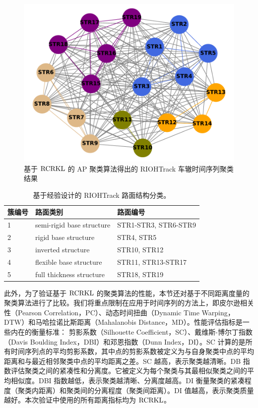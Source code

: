\begin{figure}[htbp]
\begin{center}
\includegraphics[scale=0.5]{./ch2/fig2_9.pdf}
\caption{基于 $\rm{RCRKL}$ 的 AP 聚类算法得出的 RIOHTrack 车辙时间序列聚类结果} \label{fig3}
\end{center}
\end{figure}

\begin{table}[!ht]
\fontsize{8}{14}\selectfont
\centering
\caption{基于经验设计的 RIOHTrack 路面结构分类。}
\begin{tabular}{lll}
 \hline
 簇编号 &  路面类别 & 路面编号\\
  \hline
  1 &  semi-rigid base structure & STR1-STR3, STR6-STR9\\
  \hline
  2 &  rigid base structure & STR4, STR5\\
  \hline
  3 &  inverted structure & STR10, STR12\\
  \hline
  4 &  flexible base structure & STR11, STR13-STR17\\
  \hline
  5 &  full thickness structure & STR18, STR19\\
  \hline
\end{tabular}
\label{table1}
\end{table}

此外，为了验证基于 $\rm{RCRKL}$ 的聚类算法的性能，本节还对基于不同距离度量的聚类算法进行了比较。我们将重点限制在应用于时间序列的方法上，即皮尔逊相关性（Pearson Correlation，PC）\cite{30}、动态时间扭曲（Dynamic Time Warping，DTW）\cite{31}和马哈拉诺比斯距离（Mahalanobis Distance，MD）\cite{32}。性能评估指标是一些内在的衡量标准： 剪影系数（Silhouette Coefficient，SC）、戴维斯-博尔丁指数（Davis Boulding Index，DBI）和邓恩指数（Dunn Index，DI）。SC 计算的是所有时间序列点的平均剪影系数，其中点的剪影系数被定义为与自身聚类中点的平均距离和与最近相邻聚类中点的平均距离之差。SC 越高，表示聚类越清晰。DB 指数评估聚类之间的紧凑性和分离度。它被定义为每个聚类与其最相似聚类之间的平均相似度。DBI 指数越低，表示聚类越清晰、分离度越高。DI 衡量聚类的紧凑程度（聚类内距离）和聚类间的分离程度（聚类间距离）。DI 值越高，表示聚类质量越好。本次验证中使用的所有距离指标均为 $\rm{RCRKL}$。

